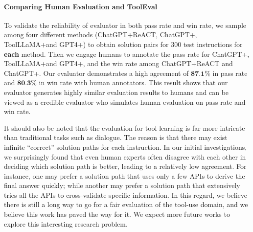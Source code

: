 \paragraph{Comparing Human Evaluation and ToolEval}
To validate the reliability of \turbo evaluator in both pass rate and win rate, we sample among four different methods (ChatGPT+ReACT, ChatGPT+\dfs, ToolLLaMA+\dfs and GPT4+\dfs) to obtain solution pairs for $300$ test instructions for \textbf{each} method. Then we engage humans to annotate the pass rate for ChatGPT+\dfs, ToolLLaMA+\dfs and GPT4+\dfs, and the win rate among ChatGPT+ReACT and ChatGPT+\dfs.
Our \turbo evaluator demonstrates a high agreement of $\textbf{87.1\%}$ in pass rate and $\textbf{80.3\%}$ in win rate with human annotators. This result shows that our evaluator generates highly similar evaluation results to humans and can be viewed as a credible evaluator who simulates human evaluation on pass rate and win rate.

It should also be noted that the evaluation for tool learning is far more intricate than traditional tasks such as dialogue. The reason is that there may exist infinite ``correct'' solution paths for each instruction.
In our initial investigations, we surprisingly found that even human experts often disagree with each other in deciding which solution path is better, leading to a relatively low agreement. For instance, one may prefer a solution path that uses only a few APIs to derive the final answer quickly; while another may prefer a solution path that extensively tries all the APIs to cross-validate specific information. In this regard, we believe there is still a long way to go for a fair evaluation of the tool-use domain, and we believe this work has paved the way for it. We expect more future works to explore this interesting research problem.

